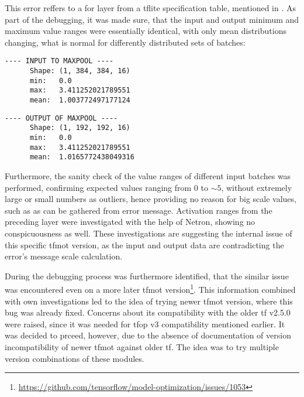 {

This error reffers to a  for  layer from a \gls{tflite} specification table,
mentioned in . As part of the debugging, it was made sure, that the input and output minimum and maximum value ranges were essentially identical,
with only mean distributions changing, what is normal for differently distributed sets of batches:

\noindent
\begin{minipage}[t]{0.48\textwidth}
\begin{lstlisting}[basicstyle=\ttfamily\small\centering, columns=fullflexible, keepspaces=true, frame=single]
      ---- INPUT TO MAXPOOL ----
      Shape: (1, 384, 384, 16)
      min:   0.0
      max:   3.411252021789551
      mean:  1.003772497177124
\end{lstlisting}
\end{minipage}%
\hfill
\begin{minipage}[t]{0.48\textwidth}
\begin{lstlisting}[basicstyle=\ttfamily\small\centering, columns=fullflexible, keepspaces=true, frame=single]
      ---- OUTPUT OF MAXPOOL ----
      Shape: (1, 192, 192, 16)
      min:   0.0
      max:   3.411252021789551
      mean:  1.0165772438049316
\end{lstlisting}
\end{minipage}


Furthermore, the sanity check of the value ranges of different input batches was performed, confirming expected values ranging from 0 to $\sim5$,
without extremely large or small numbers as outliers, hence providing no reason for big scale values, such as  as can be gathered from error message.
Activation ranges from the preceding  layer were investigated with the help of Netron, showing no conspicuousness as well.
These investigations are suggesting the internal issue of this specific \gls{tfmot} version, as the input and output data are contradicting the error's message scale calculation.


During the debugging process was furthermore identified,
that the similar issue was encountered even on a more later \gls{tfmot} version\footnote{\url{https://github.com/tensorflow/model-optimization/issues/1053}}.
This information combined with own investigations led to the idea of trying newer \gls{tfmot} version, where this bug was already fixed.
Concerns about its compatibility with the older \gls{tf} v2.5.0 were raised, since it was needed for \gls{tfop} v3 compatibility mentioned earlier.
It was decided to prceed, however, due to the absence of documentation of version incompatibility of newer \gls{tfmot} against older \gls{tf}.
The idea was to try multiple version combinations of these modules.

}
